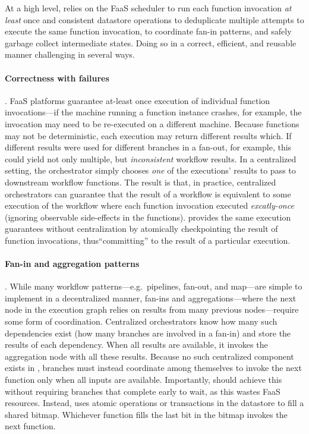 At a high level, \name{} relies on the FaaS scheduler to run each function
invocation \emph{at least} once and consistent datastore operations to
deduplicate multiple attempts to execute the same function invocation, to
coordinate fan-in patterns, and safely garbage collect intermediate states.
Doing so in a correct, efficient, and reusable manner challenging in several
ways.

\paragraph{Correctness with failures}. FaaS platforms guarantee at-least once
execution of individual function invocations---if the machine running a function
instance crashes, for example, the invocation may need to be re-executed on a
different machine. Because functions may not be deterministic, each execution
may return different results which. If different results were used for different
branches in a fan-out, for example, this could yield not only multiple, but
\emph{inconsistent} workflow results. In a centralized setting, the orchestrator
simply chooses \emph{one} of the executions' results to pass to downstream
workflow functions. The result is that, in practice, centralized orchestrators
can guarantee that the result of a workflow is equivalent to some execution of
the workflow where each function invocation executed \emph{excatly-once}
(ignoring observable side-effects in the functions).  \name{} provides the same
execution guarantees without centralization by atomically checkpointing the
result of function invocations, thus``committing'' to the result of a particular
execution.


\paragraph{Fan-in and aggregation patterns}. While many workflow
patterns---e.g.\ pipelines, fan-out, and map---are simple to implement in a
decentralized manner, fan-ins and aggregations---where the next node in the
execution graph relies on results from many previous nodes---require some form
of coordination. Centralized orchestrators know how many such dependencies exist
(how many branches are involved in a fan-in) and store the results of each
dependency. When all results are available, it invokes the aggregation node with
all these results. Because no such centralized component exists in \name{},
branches must instead coordinate among themselves to invoke the next function
only when all inputs are available. Importantly, \name{} should achieve this
without requiring branches that complete early to wait, as this wastes FaaS
resources. Instead, \name{} uses atomic operations or transactions in the
datastore to fill a shared bitmap. Whichever function fills the last bit in the
bitmap invokes the next function.

